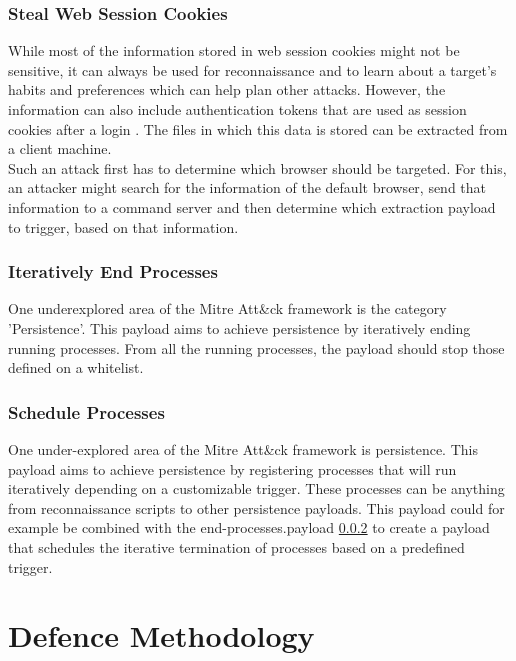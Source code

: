 \subsubsection{Steal Web Session Cookies}

While most of the information stored in web session cookies might not be sensitive, it can always be used for reconnaissance and to learn about a target's habits and preferences which can help plan other attacks. However, the information can also include authentication tokens that are used as session cookies after a login \cite{StealWebSession}. The files in which this data is stored can be extracted from a client machine. \\
Such an attack first has to determine which browser should be targeted. For this, an attacker might search for the information of the default browser, send that information to a command server and then determine which extraction payload to trigger, based on that information. 


\subsubsection{Iteratively End Processes} \label{Iteratively End Processes}

One underexplored area of the Mitre Att\&ck framework is the category 'Persistence'. This payload aims to achieve persistence by iteratively ending running processes. From all the running processes, the payload should stop those defined on a whitelist.


\subsubsection{Schedule Processes}

One under-explored area of the Mitre Att\&ck framework is persistence. This payload aims to achieve persistence by registering processes that will run iteratively depending on a customizable trigger. These processes can be anything from reconnaissance scripts to other persistence payloads. This payload could for example be combined with the end-processes.payload \ref{Iteratively End Processes} to create a payload that schedules the iterative termination of processes based on a predefined trigger.



\section{Defence Methodology} \label{Defence Methodology}

